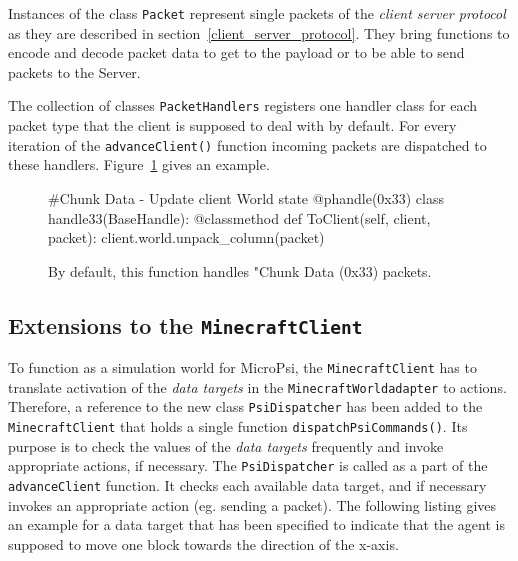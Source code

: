 Instances of the class \texttt{Packet} represent single packets of the \emph{client server protocol} as they are described in section~\ref{client_server_protocol}. They bring functions to encode and decode packet data to get to the payload or to be able to send packets to the Server.

The collection of classes \texttt{PacketHandlers} registers one handler class for each packet type that the client is supposed to deal with by default. For every iteration of the \texttt{advanceClient()} function incoming packets are dispatched to these handlers. Figure~\ref{packet_handling} gives an example.


		\begin{figure}[ht]
			\centering
			\begin{minipage}{11cm}
				\begin{pseudocode}
#Chunk Data - Update client World state
@phandle(0x33)
class handle33(BaseHandle):
	@classmethod
	def ToClient(self, client, packet):
		client.world.unpack_column(packet)
					\end{pseudocode}
				\caption{By default, this function handles "Chunk Data (0x33) packets.}
				\label{packet_handling}
			\end{minipage}
		\end{figure}

        \subsection{Extensions to the \texttt{MinecraftClient}}
        \label{extensions_client}
To function as a simulation world for MicroPsi, the \texttt{MinecraftClient} has to translate activation of the \emph{data targets} in the \texttt{MinecraftWorldadapter} to actions. Therefore, a reference to the new class \texttt{PsiDispatcher} has been added to the \texttt{MinecraftClient} that holds a single function \texttt{dispatchPsiCommands()}. Its purpose is to check the values of the \emph{data targets} frequently and invoke appropriate actions, if necessary. The \texttt{PsiDispatcher} is called as a part of the \texttt{advanceClient} function. It checks each available data target, and if necessary invokes an appropriate action (eg. sending a packet). The following listing gives an example for a data target that has been specified to indicate that the agent is supposed to move one block towards the direction of the x-axis.

